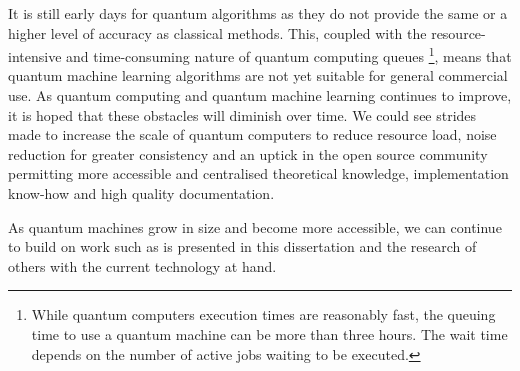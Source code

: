 It is still early days for quantum algorithms as they do not provide the same or a higher level of accuracy as classical methods. This, coupled with the resource-intensive and time-consuming nature of quantum computing queues \footnote{While quantum computers execution times are reasonably fast, the queuing time to use a quantum machine can be more than three hours. The wait time depends on the number of active jobs waiting to be executed.}, means that quantum machine learning algorithms are not yet suitable for general commercial use. 
As quantum computing and quantum machine learning continues to improve, it is hoped that these obstacles will diminish over time. We could see strides made to increase the scale of quantum computers to reduce resource load, noise reduction for greater consistency and an uptick in the open source community permitting 
more accessible and centralised theoretical knowledge, implementation know-how and high quality documentation. 

As quantum machines grow in size and become more accessible, we can continue to build on work such as is presented in this dissertation and the research of others with the current technology at hand.
